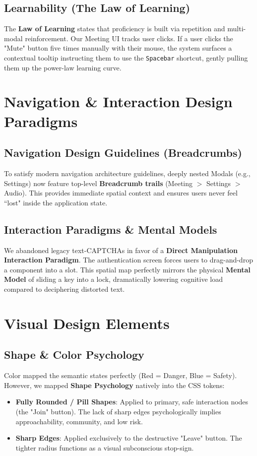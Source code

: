 \documentclass[12pt,a4paper]{article}
\begin{document}
\subsection{Learnability (The Law of Learning)}
The \textbf{Law of Learning} states that proficiency is built via repetition and multi-modal reinforcement. Our Meeting UI tracks user clicks. If a user clicks the "Mute" button five times manually with their mouse, the system surfaces a contextual tooltip instructing them to use the \texttt{Spacebar} shortcut, gently pulling them up the power-law learning curve.

\section{Navigation \& Interaction Design Paradigms}

\subsection{Navigation Design Guidelines (Breadcrumbs)}
To satisfy modern navigation architecture guidelines, deeply nested Modals (e.g., Settings) now feature top-level \textbf{Breadcrumb trails} (Meeting $>$ Settings $>$ Audio). This provides immediate spatial context and ensures users never feel ``lost" inside the application state.

\subsection{Interaction Paradigms \& Mental Models}
We abandoned legacy text-CAPTCHAs in favor of a \textbf{Direct Manipulation Interaction Paradigm}. The authentication screen forces users to drag-and-drop a component into a slot. This spatial map perfectly mirrors the physical \textbf{Mental Model} of sliding a key into a lock, dramatically lowering cognitive load compared to deciphering distorted text.

\section{Visual Design Elements}

\subsection{Shape \& Color Psychology}
Color mapped the semantic states perfectly (Red = Danger, Blue = Safety). However, we mapped \textbf{Shape Psychology} natively into the CSS tokens:
\begin{itemize}
    \item \textbf{Fully Rounded / Pill Shapes}: Applied to primary, safe interaction nodes (the "Join" button). The lack of sharp edges psychologically implies approachability, community, and low risk.
    \item \textbf{Sharp Edges}: Applied exclusively to the destructive "Leave" button. The tighter radius functions as a visual subconscious stop-sign.
\end{itemize}
\end{document}

